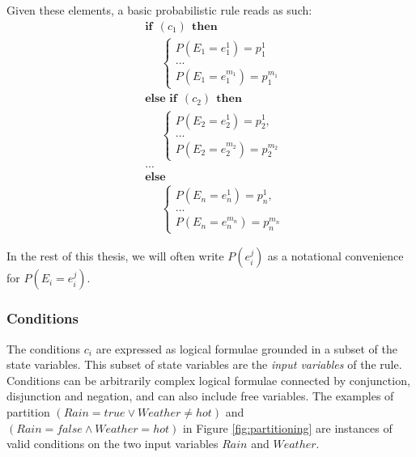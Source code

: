 Given these elements, a basic probabilistic rule reads as such:
\begin{equation}
\begin{aligned}
& \textbf{if} \ \ (c_{1}) \ \ \textbf{then} \\ 
& \;\;\;\;\; \begin{cases}
P(E_1\!=\!e_1^1) = p_1^1 \\
 ... \\
P(E_1\!=\!e_1^{m_1}) = p_1^{m_1} 
\end{cases} \\[3mm]
& \textbf{else if} \ \ (c_{2}) \ \ \textbf{then} \\ 
& \;\;\;\;\; \begin{cases}
P(E_2\!=\!e_2^1) = p_2^1, \\
 ... \\
P(E_2\!=\!e_2^{m_2}) = p_2^{m_2}
\end{cases} \\ 
& ...  \\
& \textbf{else} \\
& \;\;\;\;\; \begin{cases}
P(E_n\!=\!e_n^1) = p_n^1, \\
... \\
P(E_n\!=\!e_n^{m_n}) = p_n^{m_n}
\end{cases}
\end{aligned}
\label{eq:probrule}
\end{equation}

 In the rest of this thesis, we will often write $P(e_i^j)$ as a notational convenience for $P(E_i = e_i^j)$. 


\subsubsection*{Conditions}

The conditions $c_i$ are expressed as logical formulae grounded in a subset of the state variables. This subset of state variables are the \textit{input variables} of the rule. Conditions can be arbitrarily complex logical formulae connected by conjunction, disjunction and negation, and can also include free variables. The examples of partition  $(\mathit{Rain}\!=\mathit{true} \lor \mathit{Weather}\!\neq\mathit{hot})$ and $(\mathit{Rain}\!=\mathit{false} \land \mathit{Weather}\!=\mathit{hot})$ in Figure \ref{fig:partitioning} are instances of valid conditions on the two input variables $Rain$ and $\mathit{Weather}$. 

